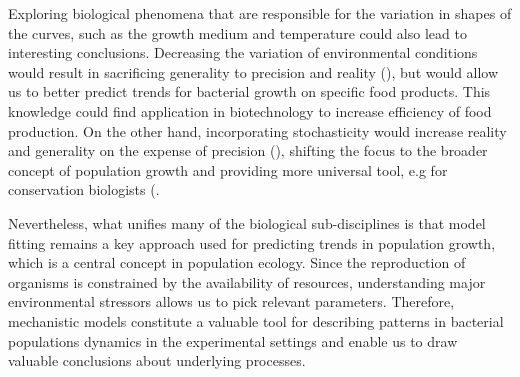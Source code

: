 \documentclass[a4paper,11pt]{article}
\begin{document}
Exploring biological phenomena that are responsible for the variation in shapes of the curves, such as the growth medium and temperature could also lead to interesting conclusions. Decreasing the variation of environmental conditions would result in sacrificing generality to precision and reality (\cite{levins1966strategy}), but would allow us to better predict trends for bacterial growth on specific food products. This knowledge could find application in biotechnology to increase efficiency of food production. On the other hand, incorporating stochasticity would increase reality and generality on the expense of precision (\cite{levins1966strategy}), shifting the focus to the broader concept of population growth and providing more universal tool, e.g for conservation biologists (\cite{manlik2022stochastic}.\par

Nevertheless, what unifies many of the biological sub-disciplines is that model fitting remains a key approach used for predicting trends in population growth, which is a central concept in population ecology. Since the reproduction of organisms is constrained by the availability of resources, understanding major environmental stressors allows us to pick relevant parameters. Therefore, mechanistic models constitute a valuable tool for describing patterns in bacterial populations dynamics in the experimental settings and enable us to draw valuable conclusions about underlying processes.



\end{document}
